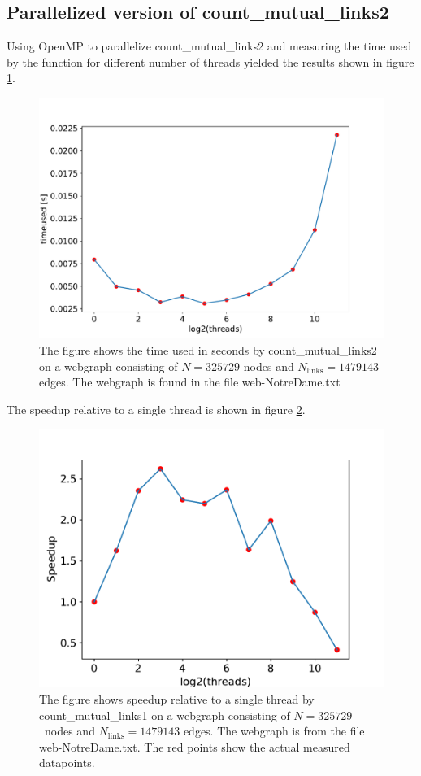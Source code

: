 \documentclass[english,notitlepage, reprint]{revtex4-1}  %
\begin{document}
\subsection*{Parallelized version of count\_mutual\_links2}
Using OpenMP to parallelize count\_mutual\_links2 and measuring the time used by the function for different number of threads yielded the results shown in figure \ref{fig:count_mutual_links2_parallel}.
\begin{figure}[H]
    \centering
    \includegraphics[scale = 0.4]{count_mutual_links2_parallel.pdf}
    \caption{The figure shows the time used  in seconds by count\_mutual\_links2 on a webgraph consisting of $N = 325729$ nodes and $N_\text{links} = 1479143$ edges. The webgraph is found in the file web-NotreDame.txt}\label{fig:count_mutual_links2_parallel}
\end{figure}
The speedup relative to a single thread is shown in figure \ref{fig:count_mutual_links2_speedup}.
\begin{figure}[H]
    \centering
    \includegraphics[scale = 0.5]{count_mutual_links2_speedup.pdf}
    \caption{The figure shows speedup relative to a single thread by count\_mutual\_links1 on a webgraph consisting of $N = 325729$ nodes and $N_\text{links} = 1479143$ edges. The webgraph is from the file web-NotreDame.txt. The red points show the actual measured datapoints.}\label{fig:count_mutual_links2_speedup}
\end{figure}
\end{document}
